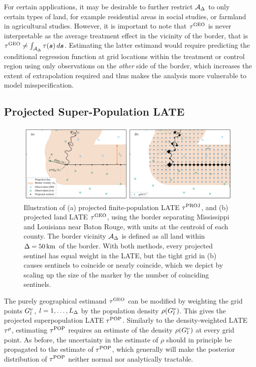 \documentclass[letter,12pt]{article}
\begin{document}
For certain applications, it may be desirable to further restrict \(\mathcal{A}_\Delta\) to only certain types of land, for example residential areas in social studies, or farmland in agricultural studies.
However, it is important to note that \(\tau^{\mathrm{GEO}}\) is never interpretable as the average treatment effect in the vicinity of the border, that is \(\tau^{\mathrm{GEO}} \neq \int_{\mathcal{A}_\Delta} \tau(\bm{s}) \mathop{d \bm{s}}\).
Estimating the latter estimand would require predicting the conditional regression function at grid locations within the treatment or control region using only observations on the \emph{other} side of the border, which increases the extent of extrapolation required and thus makes the analysis more vulnerable to model misspecification.

\subsection{Projected Super-Population LATE}

\begin{figure}[tbp]
    \centering
    \includegraphics[width=\textwidth]{../figures/mississippi_projection_methods.png}
    \caption{\label{fig:mississippi_projection_methods}
        Illustration of (a) projected finite-population LATE \(\tau^{\mathrm{PROJ}}\), and (b) projected land LATE \(\tau^{\mathrm{GEO}}\), using the border separating Mississippi and Louisiana near Baton Rouge, with units at the centroid of each county.
        The border vicinity \(\mathcal{A}_\Delta\) is defined as all land within \(\Delta=50\,\mathrm{km}\) of the border.
    With both methods, every projected sentinel has equal weight in the LATE, but the tight grid in (b) causes sentinels to coincide or nearly coincide, which we depict by scaling up the size of the marker by the number of coinciding sentinels.}
\end{figure}

The purely geographical estimand \(\tau^{\mathrm{GEO}}\) can be modified by weighting the grid points \(G^\nu_l\), \(l=1,\dotsc,L_\Delta\) by the population density \(\rho\del{\grid_l}\).
This gives the projected superpopulation LATE \(\tau^{\mathrm{POP}}\).
Similarly to the density-weighted LATE \(\tau^{\rho}\), estimating \(\tau^{\mathrm{POP}}\) requires an estimate of the density \(\rho\del{\grid_l}\) at every grid point.
As before, the uncertainty in the estimate of \(\rho\) should in principle be propagated to the estimate of \(\tau^{\mathrm{POP}}\), which generally will make the posterior distribution of \(\tau^{\mathrm{POP}}\) neither normal nor analytically tractable.
\end{document}
